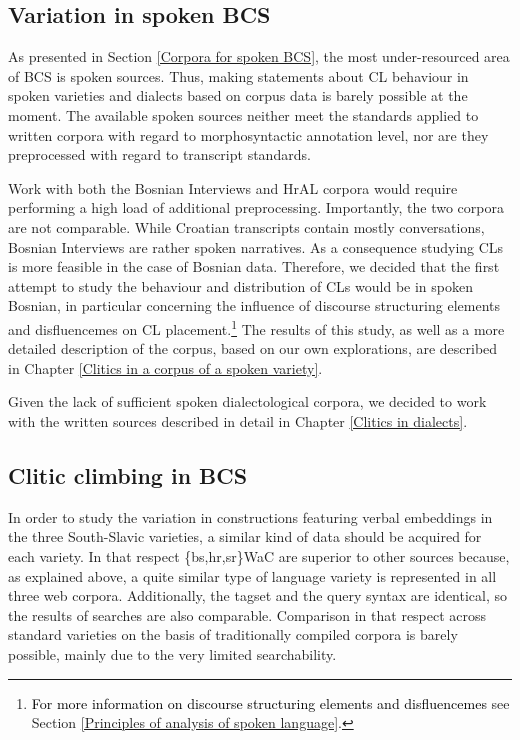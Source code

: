 \subsection{Variation in spoken BCS}
\label{Parameters of variation in spoken BCS}
As presented in Section \ref{Corpora for spoken BCS}, the most under-resourced area of BCS is spoken sources. Thus, making statements about CL behaviour in spoken varieties and dialects based on corpus data is barely possible at the moment. The available spoken sources neither meet the standards applied to written corpora with regard to morphosyntactic annotation level, nor are they preprocessed with regard to  transcript standards.

Work with both the Bosnian Interviews and HrAL corpora would require performing a high load of additional preprocessing. Importantly, the two corpora are not comparable. While Croatian transcripts contain mostly conversations, Bosnian Interviews are rather spoken narratives. As a consequence studying CLs is more feasible in the case of Bosnian data. Therefore, we decided that the first attempt to study the behaviour and distribution of CLs would be in spoken Bosnian, in particular concerning the influence of discourse structuring elements and disfluencemes on CL placement.\footnote{\textcolor{black}{For more information on discourse structuring elements and disfluencemes} see Section \ref{Principles of analysis of spoken language}.} The results of this study, as well as a more detailed description of the corpus, based on our own explorations, are described in Chapter \ref{Clitics in a corpus of a spoken variety}.

Given the lack of sufficient spoken dialectological corpora, we decided to work with the written sources described in detail in Chapter \ref{Clitics in dialects}.

\subsection{Clitic climbing in BCS}
\label{Clitic climbing in BCS}

In order to study the variation in constructions featuring verbal embeddings in the three South-Slavic varieties, a similar kind of data should be acquired for each variety. In that respect \{bs,hr,sr\}WaC are superior to other sources because, as explained above, a quite similar type of language variety is represented in all three web corpora. Additionally, the tagset and the query syntax are identical, so the results of searches are also comparable. Comparison in that respect across standard varieties on the basis of traditionally compiled corpora is barely possible, mainly due to the very limited searchability. 

